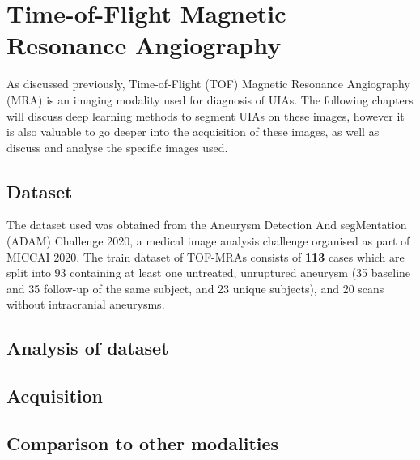 \chapter{Time-of-Flight Magnetic Resonance Angiography}
\label{chapter3}
As discussed previously, Time-of-Flight (TOF) Magnetic Resonance Angiography (MRA) is an imaging modality used for diagnosis of UIAs. The following chapters will discuss deep learning methods to segment UIAs on these images, however it is also valuable to go deeper into the acquisition of these images, as well as discuss and analyse the specific images used.

\section{Dataset}
The dataset used was obtained from the Aneurysm Detection And segMentation (ADAM) Challenge 2020, a medical image analysis challenge organised as part of MICCAI 2020. The train dataset of TOF-MRAs consists of \textbf{113} cases which are split into 93 containing at least one untreated, unruptured aneurysm (35 baseline and 35 follow-up of the same subject, and 23 unique subjects), and 20 scans without intracranial aneurysms.   

\section{Analysis of dataset}

\section{Acquisition}



\section{Comparison to other modalities}

